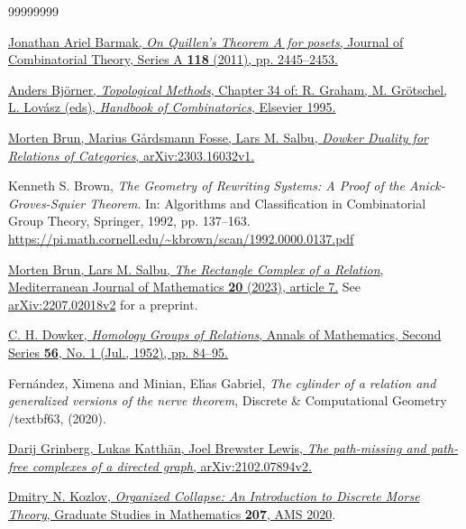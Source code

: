 \documentclass[numbers=enddot,12pt,final,onecolumn,notitlepage]{scrartcl}%
\theoremstyle{definition}
\begin{document}
\begin{thebibliography}{99999999}                                                                                         %


%
\href{https://doi.org/10.1016/j.jcta.2011.06.008}{Jonathan Ariel Barmak,
\textit{On Quillen's Theorem A for posets}, Journal of Combinatorial Theory,
Series A \textbf{118} (2011), pp. 2445--2453.}

%
\href{https://publish.illinois.edu/ymb/files/2020/03/Bjorner_TopMeth.pdf}{Anders
Bj\"{o}rner, \textit{Topological Methods}, Chapter 34 of: R. Graham, M.
Gr\"{o}tschel, L. Lov\'{a}sz (eds), \textit{Handbook of Combinatorics},
Elsevier 1995.}

\href{https://arxiv.org/abs/2303.16032v1}{Morten
Brun, Marius G\aa rdsmann Fosse, Lars M. Salbu, \textit{Dowker Duality for
Relations of Categories}, arXiv:2303.16032v1.}

Kenneth S. Brown,
\textit{The Geometry of Rewriting Systems: A Proof of the Anick-Groves-Squier Theorem}.
In: Algorithms and Classification in Combinatorial Group Theory,
Springer, 1992, pp. 137--163. \\
\url{https://pi.math.cornell.edu/~kbrown/scan/1992.0000.0137.pdf}

%
\href{https://doi.org/10.1007/s00009-022-02213-0}{Morten Brun, Lars M. Salbu,
\textit{The Rectangle Complex of a Relation}, Mediterranean Journal of
Mathematics \textbf{20} (2023), article 7.} See
\href{https://arxiv.org/abs/2207.02018v2}{arXiv:2207.02018v2} for a preprint.

\href{https://doi.org/10.2307/1969768}{C. H.
Dowker, \textit{Homology Groups of Relations}, Annals of Mathematics, Second
Series \textbf{56}, No. 1 (Jul., 1952), pp. 84--95.}

%
  {Fern{\'a}ndez, Ximena and Minian, El{\'\i}as Gabriel,
  \textit{
  The cylinder of a relation and generalized versions of the nerve theorem},
  Discrete \& Computational Geometry
  /textbf{63},
    (2020)}.

\href{https://arxiv.org/abs/2102.07894v2}{Darij
Grinberg, Lukas Katth\"{a}n, Joel Brewster Lewis, \textit{The path-missing and
path-free complexes of a directed graph}, arXiv:2102.07894v2.}

\href{https://bookstore.ams.org/gsm-207}{Dmitry N.
Kozlov, \textit{Organized Collapse: An Introduction to Discrete Morse Theory},
Graduate Studies in Mathematics \textbf{207}, AMS 2020}.


\end{thebibliography}
\end{document}
